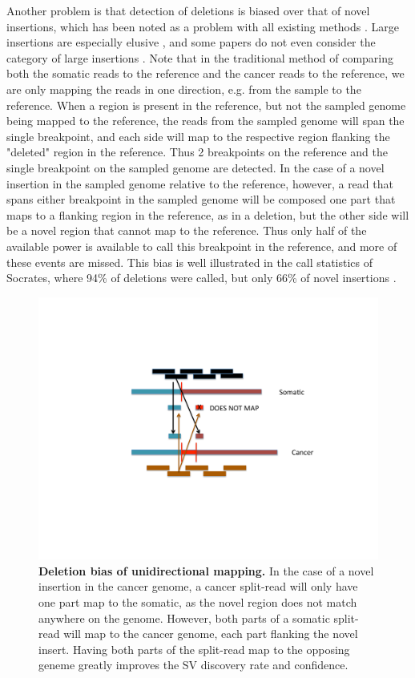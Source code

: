 \documentclass{easychithesis}
\begin{document}
Another problem is that detection of deletions is biased over that of novel insertions, which has been noted as a problem with all existing methods \cite{lee2008robust, medvedev2009computational, jiang2012prism, abel2013detection, alkan2011genome}. Large insertions are especially elusive \cite{abel2013detection}, and some papers do not even consider the category of large insertions \cite{jiang2012prism}. Note that in the traditional method of comparing both the somatic reads to the reference and the cancer reads to the reference, we are only mapping the reads in one direction, e.g. from the sample to the reference. When a region is present in the reference, but not the sampled genome being mapped to the reference, the reads from the sampled genome will span the single breakpoint, and each side will map to the respective region flanking the "deleted" region in the reference. Thus 2 breakpoints on the reference and the single breakpoint on the sampled genome are detected. In the case of a novel insertion in the sampled genome relative to the reference, however, a read that spans either breakpoint in the sampled genome will be composed one part that maps to a flanking region in the reference, as in a deletion, but the other side will be a novel region that cannot map to the reference. Thus only half of the available power is available to call this breakpoint in the reference, and more of these events are missed. This bias is well illustrated in the call statistics of Socrates, where 94\% of deletions were called, but only 66\% of novel insertions \cite{schroder2014socrates}.

\begin{figure}[!ht]
\begin{center}
\includegraphics[width = 0.95  \linewidth]{../Code/Figures/DeletionBias.pdf}
\end{center}
\caption{{\bf Deletion bias of unidirectional mapping.} In the case of a novel insertion in the cancer genome, a cancer split-read will only have one part map to the somatic, as the novel region does not match anywhere on the genome. However, both parts of a somatic split-read will map to the cancer genome, each part flanking the novel insert. Having both parts of the split-read map to the opposing geneme greatly improves the SV discovery rate and confidence.}
\label{fig:DeletionBias}
\end{figure}
\end{document}
